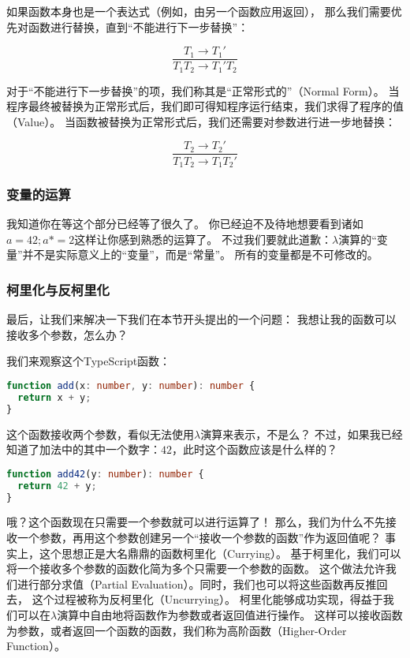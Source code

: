 \documentclass[../main.tex]{subfiles}
\begin{document}
      \indent 如果函数本身也是一个表达式（例如，由另一个函数应用返回），
      那么我们需要优先对函数进行替换，直到“不能进行下一步替换”：

      $$\frac{T_1 \to T_1'}{T_1 T_2 \to T_1' T_2}$$

      \indent 对于“不能进行下一步替换”的项，我们称其是“正常形式的”（Normal Form）\cite{tapl}。
      当程序最终被替换为正常形式后，我们即可得知程序运行结束，我们求得了程序的值（Value）。
      当函数被替换为正常形式后，我们还需要对参数进行进一步地替换：

      $$\frac{T_2 \to T_2'}{T_1 T_2 \to T_1 T_2'}$$
      
    \subsubsection*{变量的运算}
      \indent 我知道你在等这个部分已经等了很久了。
      你已经迫不及待地想要看到诸如$a = 42; a *= 2$这样让你感到熟悉的运算了。
      不过我们要就此道歉：$\lambda$演算的“变量”并不是实际意义上的“变量”，而是“常量”。
      所有的变量都是不可修改的。

    \subsubsection*{柯里化与反柯里化}
      \indent 最后，让我们来解决一下我们在本节开头提出的一个问题：
      我想让我的函数可以接收多个参数，怎么办？

      \indent 我们来观察这个TypeScript函数：

\begin{lstlisting}[language=TypeScript]
function add(x: number, y: number): number {
  return x + y;
}
\end{lstlisting}

      \indent 这个函数接收两个参数，看似无法使用$\lambda$演算来表示，不是么？
      不过，如果我已经知道了加法中的其中一个数字：$42$，此时这个函数应该是什么样的？

\begin{lstlisting}[language=TypeScript]
function add42(y: number): number {
  return 42 + y;
}
\end{lstlisting}

      \indent 哦？这个函数现在只需要一个参数就可以进行运算了！
      那么，我们为什么不先接收一个参数，再用这个参数创建另一个“接收一个参数的函数”作为返回值呢？
      事实上，这个思想正是大名鼎鼎的函数柯里化（Currying）。
      基于柯里化，我们可以将一个接收多个参数的函数化简为多个只需要一个参数的函数。
      这个做法允许我们进行部分求值（Partial Evaluation）。同时，我们也可以将这些函数再反推回去，
      这个过程被称为反柯里化（Uncurrying）\cite{currywiki}。
      柯里化能够成功实现，得益于我们可以在$\lambda$演算中自由地将函数作为参数或者返回值进行操作。
      这样可以接收函数为参数，或者返回一个函数的函数，我们称为高阶函数（Higher-Order Function）\cite{highwiki}。
\end{document}
